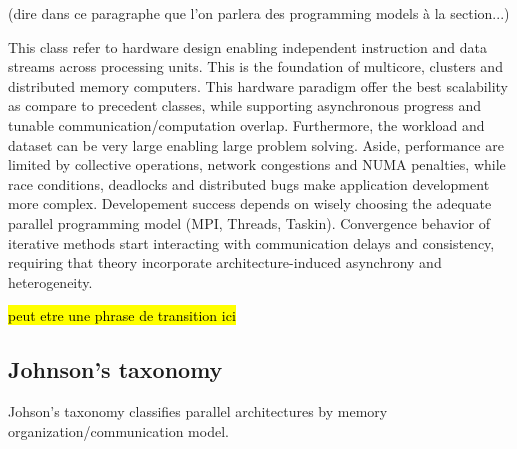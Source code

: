 \begin{description}
(dire dans ce paragraphe que l'on parlera des programming models à la section...)

\item[MIMD (Multiple Instruction, Multiple Data)] This class refer to hardware design enabling independent instruction and data streams across processing units. This is the foundation of multicore, clusters and distributed memory computers. This hardware paradigm offer the best scalability as compare to precedent classes, while supporting asynchronous progress and tunable communication/computation overlap. Furthermore, the workload and dataset can be very large enabling large problem solving. Aside, performance are limited by collective operations, network congestions and NUMA penalties, while race conditions, deadlocks and distributed bugs make application development more complex. Developement success depends on wisely choosing the adequate parallel programming model (MPI, Threads, Taskin). Convergence behavior of iterative methods start interacting with communication delays and consistency, requiring that theory incorporate architecture-induced asynchrony and heterogeneity. 


\end{description}

\hl{peut etre une phrase de transition ici}



\subsection{Johnson's taxonomy}

Johson's taxonomy classifies parallel architectures by memory organization/communication model.

